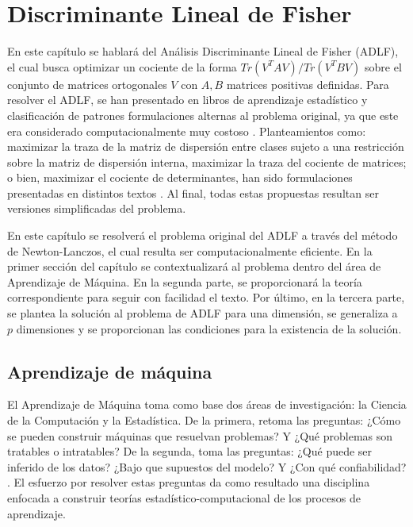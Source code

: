 \chapter{Discriminante Lineal de Fisher}
\label{ch:chapter2}

En este capítulo se hablará del Análisis Discriminante Lineal de Fisher (ADLF), el cual busca optimizar un cociente de la forma $Tr(V^T A V) / Tr(V^T B V)$ sobre el conjunto de matrices ortogonales $V$ con $A, B$ matrices positivas definidas. Para resolver el ADLF, se han presentado en libros de aprendizaje estadístico y clasificación de patrones formulaciones alternas al problema original, ya que este era considerado computacionalmente muy costoso \cite{wang2007trace}\cite{ngo2012trace}. Planteamientos como: maximizar la traza de la matriz de dispersión entre clases sujeto a una restricción sobre la matriz de dispersión interna, maximizar la traza del cociente de matrices; o bien, maximizar el cociente de determinantes, han sido formulaciones presentadas en distintos textos \cite{duda2012pattern} \cite{hastie2009elements} \cite{mitchell2006discipline} \cite{fukunaga2013introduction}. Al final, todas estas propuestas resultan ser versiones simplificadas del problema.

En este capítulo se resolverá el problema original del ADLF a través del método de Newton-Lanczos, el cual resulta ser computacionalmente eficiente. En la primer sección del capítulo se contextualizará al problema dentro del área de Aprendizaje de Máquina. En la segunda parte, se proporcionará la teoría correspondiente para seguir con facilidad el texto. Por último, en la tercera parte, se plantea la solución al problema de ADLF para una dimensión, se generaliza a $p$ dimensiones y se proporcionan las condiciones para la existencia de la solución.


\section{Aprendizaje de máquina}
El Aprendizaje de Máquina toma como base dos áreas de investigación: la Ciencia de la Computación y la Estadística. De la primera, retoma las preguntas: ¿Cómo se pueden construir máquinas que resuelvan problemas? Y ¿Qué problemas son tratables o intratables? De la segunda, toma las preguntas: ¿Qué puede ser inferido de los datos? ¿Bajo que supuestos del modelo? Y ¿Con qué confiabilidad? \cite{mitchell2006discipline}. El esfuerzo por resolver estas preguntas da como resultado una disciplina enfocada a construir teorías estadístico-computacional de los procesos de aprendizaje.

